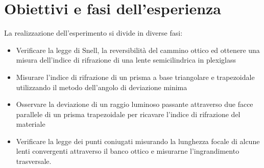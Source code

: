 \section{Obiettivi e fasi dell'esperienza}
La realizzazione dell'esperimento si divide in diverse fasi:
\begin{itemize}
    \item Verificare  la  legge  di  Snell,  la  reversibilità  del cammino ottico ed ottenere una misura dell'indice di rifrazione di una lente semicilindrica in plexiglass
    \item  Misurare l'indice di rifrazione di un prisma a base triangolare e trapezoidale utilizzando il metodo dell'angolo di deviazione minima
    \item Osservare la deviazione di un raggio luminoso passante attraverso due facce parallele di un prisma trapezoidale per ricavare l'indice di rifrazione del materiale
    \item  Verificare  la  legge  dei punti coniugati misurando  la lunghezza focale di alcune lenti convergenti attraverso il banco ottico e misurarne l'ingrandimento trasversale.
\end{itemize}
\newpage








